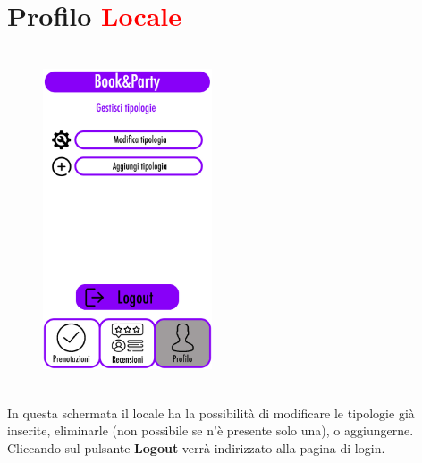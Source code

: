 \section{Profilo \textcolor{red}{Locale}} \label{sec:proLocale}
\begin{figure}[h]
    \centering
    \includegraphics[width=5cm, height=10cm]{mockup/10-profilo-locale.jpg}
    \label{fig:profiloLocale}
\end{figure}

In questa schermata il locale ha la possibilità di modificare le tipologie già inserite, 
eliminarle (non possibile se n'è presente solo una), o aggiungerne.
Cliccando sul pulsante \textbf{Logout} verrà indirizzato alla pagina di login.

\newpage
